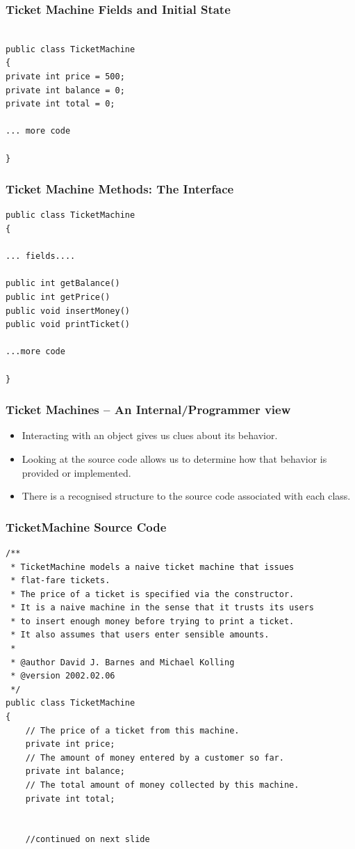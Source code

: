 \documentclass{beamer}
\begin{document}
\begin{frame}[fragile]
\frametitle{Ticket Machine Fields and Initial State}
\begin{lstlisting}[linewidth=5cm]

public class TicketMachine
{
private int price = 500;
private int balance = 0;
private int total = 0;

... more code

}
\end{lstlisting}
\end{frame}


\begin{frame}[fragile]
\frametitle{Ticket Machine Methods: The Interface}
\begin{lstlisting}[linewidth=7cm]
public class TicketMachine
{

... fields....

public int getBalance()
public int getPrice()
public void insertMoney()
public void printTicket()

...more code

}

\end{lstlisting}
\end{frame}

\begin{frame}
\frametitle{Ticket Machines – An Internal/Programmer view}
\begin{itemize}
\item Interacting with an object gives us clues about its behavior.
\item Looking at the source code allows us to determine how that behavior is provided or implemented.
\item There is a recognised structure to the source code associated with each class.
\end{itemize}
\end{frame}

\begin{frame}[fragile]
\frametitle{TicketMachine Source Code}
\tiny
\begin{lstlisting}
/**
 * TicketMachine models a naive ticket machine that issues
 * flat-fare tickets.
 * The price of a ticket is specified via the constructor.
 * It is a naive machine in the sense that it trusts its users
 * to insert enough money before trying to print a ticket.
 * It also assumes that users enter sensible amounts.
 *
 * @author David J. Barnes and Michael Kolling
 * @version 2002.02.06
 */
public class TicketMachine
{
    // The price of a ticket from this machine.
    private int price;
    // The amount of money entered by a customer so far.
    private int balance;
    // The total amount of money collected by this machine.
    private int total;


    //continued on next slide
\end{lstlisting}
\end{frame}
\end{document}
